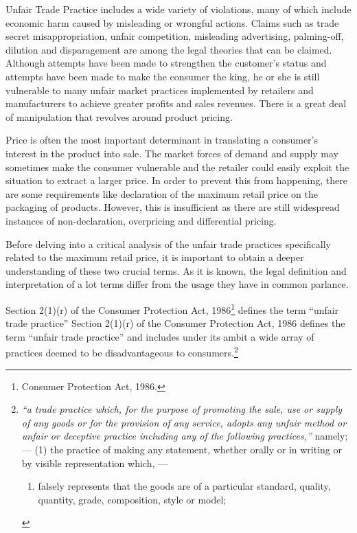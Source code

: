 \begin{multicols}{2}
\vspace{.1cm}

\noi
Unfair Trade Practice includes a wide variety of violations, many of which include economic
harm caused by misleading or wrongful actions. Claims such as trade secret misappropriation,
unfair competition, misleading advertising, palming-off, dilution and disparagement are among
the legal theories that can be claimed. Although attempts have been made to strengthen the
customer's status and attempts have been made to make the consumer the king, he or she is still
vulnerable to many unfair market practices implemented by retailers and manufacturers to achieve greater profits and sales revenues. There is a great deal of manipulation that revolves
around product pricing.

\noi
Price is often the most important determinant in translating a consumer’s interest in the product
into sale. The market forces of demand and supply may sometimes make the consumer
vulnerable and the retailer could easily exploit the situation to extract a larger price. In order to
prevent this from happening, there are some requirements like declaration of the maximum
retail price on the packaging of products. However, this is insufficient as there are still
widespread instances of non-declaration, overpricing and differential pricing.


\noi
Before delving into a critical analysis of the unfair trade practices specifically related to the
maximum retail price, it is important to obtain a deeper understanding of these two crucial
terms. As it is known, the legal definition and interpretation of a lot terms differ from the usage
they have in common parlance.

\noi
Section 2(1)(r) of the Consumer Protection Act, 1986\footnote{Consumer Protection Act, 1986.} defines the term “unfair trade practice” Section 2(1)(r) of the Consumer Protection Act, 1986 defines the term “unfair trade practice” and includes under its ambit a wide array of practices deemed to be disadvantageous to consumers.\footnote{\textit{“a trade practice which, for the purpose of promoting the sale, use or supply of any goods or for the provision of any service, adopts any unfair method or unfair or deceptive practice including any of the following practices,”} namely; —
(1) the practice of making any statement, whether orally or in writing or by visible representation which, —
\begin{enumerate}[label=(\roman*)]
\item falsely represents that the goods are of a particular standard, quality, quantity, grade, composition, style or
model;


\end{enumerate}}
\end{multicols}
